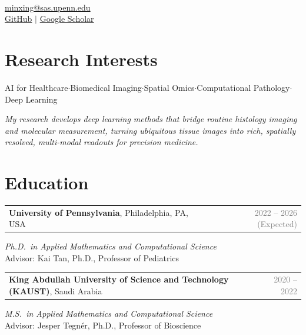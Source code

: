 \documentclass[11pt, letterpaper]{article}
\makeatletter
\newcommand{\cventry}[2]{%
  \noindent\begin{tabularx}{\textwidth}{@{}X r@{}}
    #1 & \textcolor{gray}{#2} \\
  \end{tabularx}\vspace{1pt}%
}
\makeatother
\begin{document}
\thispagestyle{fancy}

\begin{center}
  {\LARGE\bfseries\color{accent}}\\[6pt]
  {\small
    \href{mailto:minxing@sas.upenn.edu}{minxing@sas.upenn.edu} \\[2pt]
    \href{https://github.com/maxpmx}{GitHub} \enspace$\vert$\enspace
    \href{https://scholar.google.com/citations?user=wZbrjsQAAAAJ}{Google Scholar}
  }
\end{center}

\vspace{-4pt}

\section{Research Interests}

AI for Healthcare\enspace$\cdot$\enspace Biomedical Imaging\enspace$\cdot$\enspace Spatial Omics\enspace$\cdot$\enspace Computational Pathology\enspace$\cdot$\enspace Deep Learning

\vspace{4pt}
\noindent\small\textit{My research develops deep learning methods that bridge routine histology imaging and molecular measurement, turning ubiquitous tissue images into rich, spatially resolved, multi-modal readouts for precision medicine.}

\section{Education}

\cventry{\textbf{University of Pennsylvania}, Philadelphia, PA, USA}{2022 -- 2026 (Expected)}
\hspace{1em}\textit{Ph.D.\ in Applied Mathematics and Computational Science}\\
\hspace{1em}Advisor: Kai Tan, Ph.D., Professor of Pediatrics

\vspace{6pt}
\cventry{\textbf{King Abdullah University of Science and Technology (KAUST)}, Saudi Arabia}{2020 -- 2022}
\hspace{1em}\textit{M.S.\ in Applied Mathematics and Computational Science}\\
\hspace{1em}Advisor: Jesper Tegn\'er, Ph.D., Professor of Bioscience
\end{document}
